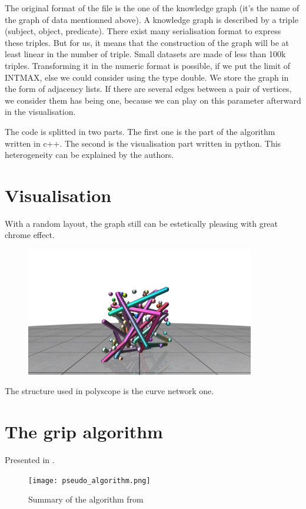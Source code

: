 \documentclass{article}
\begin{document}
The original format of the file is the one of the knowledge graph (it's the name of the graph of data mentionned above). A knowledge graph is described by a triple (subject, object, predicate). There exist many serialisation format to express these triples. But for us, it means that the construction of the graph will be at least linear in the number of triple. Small datasets are made of less than 100k triples. Transforming it in the numeric format is possible, if we put the limit of INT\textunderscore MAX, else we could consider using the type double. We store the graph in the form of adjacency lists. If there are several edges between a pair of vertices, we consider them has being one, because we can play on this parameter afterward in the visualisation. 

The code is splitted in two parts. The first one is the part of the algorithm written in c++. The second is the visualisation part written in python. This heterogeneity can be explained by the authors.

 


\section{Visualisation}
With a random layout, the graph still can be estetically pleasing with great chrome effect. 
\begin{figure}[h!]
    \includegraphics[width=10cm]{random_generator.png}
\end{figure}
The structure used in polyscope is the curve network one.

\section{The grip algorithm}

Presented in \cite{gajer00}.
\begin{figure}[h!]
    \texttt{[image: pseudo\_algorithm.png]}
    \caption{Summary of the algorithm from \cite{gajer00}}
\end{figure} 
\end{document}
